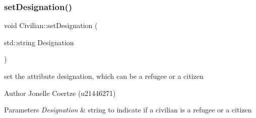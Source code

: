 \subsubsection{\texorpdfstring{setDesignation()}{setDesignation()}}
{\footnotesize\ttfamily void Civilian\+::set\+Designation (\begin{DoxyParamCaption}\item[{std\+::string}]{Designation }\end{DoxyParamCaption})}



set the attribute designation, which can be a refugee or a citizen 

\begin{DoxyAuthor}{Author}
Jonelle Coertze (u21446271) 
\end{DoxyAuthor}

\begin{DoxyParams}{Parameters}
{\em Designation} & string to indicate if a civilian is a refugee or a citizen \\
\hline
\end{DoxyParams}
